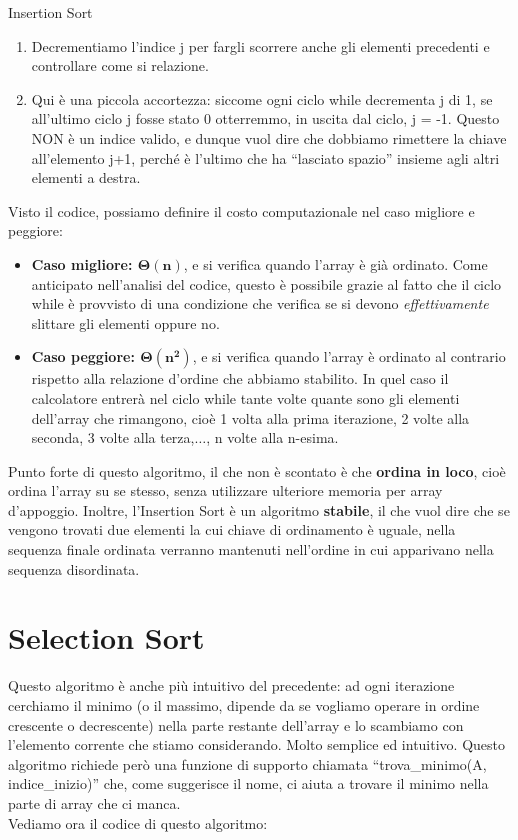 \documentclass[12pt]{report}
\begin{document}
\begin{algoritmo}{Insertion Sort}{}
\begin{enumerate}
    		\item Decrementiamo l'indice j per fargli scorrere anche gli elementi precedenti e controllare come si relazione.
    				
    		\item Qui è una piccola accortezza: siccome ogni ciclo while decrementa j di 1, se all’ultimo ciclo j fosse stato 0 otterremmo, in uscita dal ciclo, j = -1. Questo NON è un indice valido, e dunque vuol dire che dobbiamo rimettere la chiave all’elemento j+1, perché è l’ultimo che ha “lasciato spazio” insieme agli altri elementi a destra.
    				
    	\end{enumerate}
    \end{algoritmo}
    
    Visto il codice, possiamo definire il costo computazionale nel caso migliore e peggiore:
    \begin{itemize}
    				
    	\item \textbf{Caso migliore: $\mathbf{\Theta(n)}$}, e si verifica quando l’array è già ordinato. Come anticipato nell’analisi del codice, questo è possibile grazie al fatto che il ciclo while è provvisto di una condizione che verifica se si devono \textit{effettivamente} slittare gli elementi oppure no.
    				
    	\item \textbf{Caso peggiore: $\mathbf{\Theta(n^2)}$}, e si verifica quando l’array è ordinato al contrario rispetto alla relazione d’ordine che abbiamo stabilito. In quel caso il calcolatore entrerà nel ciclo while tante volte quante sono gli elementi dell’array che rimangono, cioè 1 volta alla prima iterazione, 2 volte alla seconda, 3 volte alla terza,$\dots$, n volte alla n-esima.
    				
    \end{itemize}
    			
    Punto forte di questo algoritmo, il che non è scontato è che \textbf{ordina in loco}, cioè ordina l’array su se stesso, senza utilizzare ulteriore memoria per array d’appoggio.
	Inoltre, l’Insertion Sort è un algoritmo \textbf{stabile}, il che vuol dire che se vengono trovati due elementi la cui chiave di ordinamento è uguale, nella sequenza finale ordinata verranno mantenuti nell'ordine in cui apparivano nella sequenza disordinata.
    	
    \section{Selection Sort}
    Questo algoritmo è anche più intuitivo del precedente: ad ogni iterazione cerchiamo il minimo (o il massimo, dipende da se vogliamo operare in ordine crescente o decrescente) nella parte restante dell’array e lo scambiamo con l’elemento corrente che stiamo considerando. Molto semplice ed intuitivo. Questo algoritmo richiede però una funzione di supporto chiamata “trova\_minimo(A, indice\_inizio)” che, come suggerisce il nome, ci aiuta a trovare il minimo nella parte di array che ci manca.\\
    Vediamo ora il codice di questo algoritmo:
    		
\end{document}
